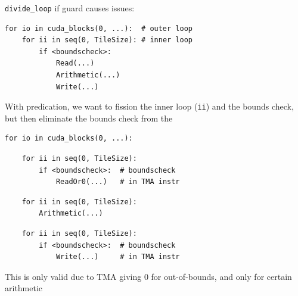 \newpage
{}

\begin{minipage}[t]{0.48\textwidth}\fixminipage
{}

\texttt{divide\_loop} if guard causes issues:

\begin{verbatim}
for io in cuda_blocks(0, ...):  # outer loop
    for ii in seq(0, TileSize): # inner loop
        if <boundscheck>:
            Read(...)
            Arithmetic(...)
            Write(...)
\end{verbatim}

With  predication, we want to fission the inner loop (\texttt{ii}) and the bounds check, but then eliminate the bounds check from the 

\begin{verbatim}
for io in cuda_blocks(0, ...):
\end{verbatim}
\begin{mdframed}[style=MyFrame, backgroundcolor=greenBoxBg]
\begin{verbatim}
    for ii in seq(0, TileSize):
        if <boundscheck>:  # boundscheck
            ReadOr0(...)   # in TMA instr
\end{verbatim}
\end{mdframed}
\begin{mdframed}[style=MyFrame, backgroundcolor=redBoxBg]
\color{redBoxFg}
\begin{verbatim}
    for ii in seq(0, TileSize):
        Arithmetic(...)
\end{verbatim}
\end{mdframed}
\begin{mdframed}[style=MyFrame, backgroundcolor=greenBoxBg]
\color{greenBoxFg}
\begin{verbatim}
    for ii in seq(0, TileSize):
        if <boundscheck>:  # boundscheck
            Write(...)     # in TMA instr
\end{verbatim}
\end{mdframed}

This is only valid due to TMA giving 0 for out-of-bounds, and only for certain arithmetic

\end{minipage}
\hfill
